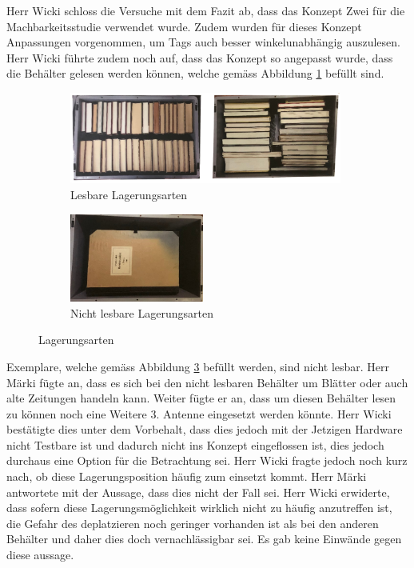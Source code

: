 \documentclass[parskip=full, a4paper]{scrreprt}
\begin{document}
Herr Wicki schloss die Versuche mit dem Fazit ab, dass das Konzept Zwei für die Machbarkeitsstudie verwendet wurde. Zudem wurden für dieses Konzept Anpassungen vorgenommen, um Tags auch besser winkelunabhängig auszulesen. Herr Wicki führte zudem noch auf, dass das Konzept so angepasst wurde, dass die Behälter gelesen werden können, welche gemäss Abbildung \ref{fig:behaelterFuellung} befüllt sind.
\begin{figure}[htb]
	\begin{subfigure}{.6\linewidth}
		\centering
		\includegraphics[keepaspectratio,height=3cm]{img/LagerungExemplare}
		\caption{Lesbare Lagerungsarten}
		\label{fig:behaelterFuellung}
	\end{subfigure}
	\begin{subfigure}{.4\linewidth}
		\centering
		\includegraphics[keepaspectratio,height=2.9cm]{img/LagerungExemplareNichtLesbar}
		\caption{Nicht lesbare Lagerungsarten}
		\label{fig:behaelterFuellungNichtLesbar}
	\end{subfigure}
	\caption{Lagerungsarten}
\end{figure}
Exemplare, welche gemäss Abbildung \ref{fig:behaelterFuellungNichtLesbar} befüllt werden, sind nicht lesbar. Herr Märki fügte an, dass es sich bei den nicht lesbaren Behälter um Blätter oder auch alte Zeitungen handeln kann. Weiter fügte er an, dass um diesen Behälter lesen zu können noch eine Weitere 3. Antenne eingesetzt werden könnte. Herr Wicki bestätigte dies unter dem Vorbehalt, dass dies jedoch mit der Jetzigen Hardware nicht Testbare ist und dadurch nicht ins Konzept eingeflossen ist, dies jedoch durchaus eine Option für die Betrachtung sei. Herr Wicki fragte jedoch noch kurz nach, ob diese Lagerungsposition häufig zum einsetzt kommt. Herr Märki antwortete mit der Aussage, dass dies nicht der Fall sei. Herr Wicki erwiderte, dass sofern diese Lagerungsmöglichkeit wirklich nicht zu häufig anzutreffen ist, die Gefahr des deplatzieren noch geringer vorhanden ist als bei den anderen Behälter und daher dies doch vernachlässigbar sei. Es gab keine Einwände gegen diese aussage.
\end{document}
